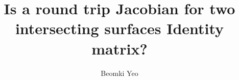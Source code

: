 \title{Is a round trip Jacobian for two intersecting surfaces Identity matrix?}
\author{Beomki Yeo}
